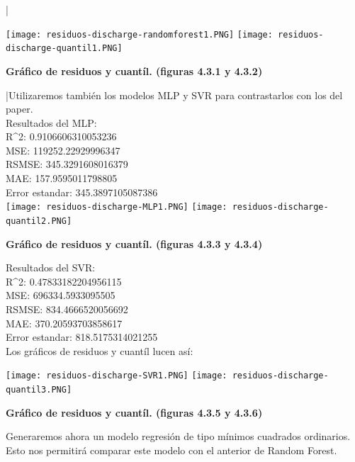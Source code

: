|\documentclass{article}
\begin{document}
        \texttt{[image: residuos-discharge-randomforest1.PNG]}
        \texttt{[image: residuos-discharge-quantil1.PNG]} \\
                \begin{center}
            \textbf{Gráfico de residuos y cuantíl. (figuras 4.3.1 y 4.3.2)}
        \end{center}



    |Utilizaremos también los modelos MLP y SVR para contrastarlos con los del paper.\\
Resultados del MLP:\\
    {R^2}:  0.9106606310053236\\
    MSE:  119252.22929996347\\
    RSMSE:  345.3291608016379\\
    MAE:  157.9595011798805\\
    Error estandar:  345.3897105087386\\
                                                         



        \texttt{[image: residuos-discharge-MLP1.PNG]} 
        \texttt{[image: residuos-discharge-quantil2.PNG]} \\
        \begin{center}
            \textbf{Gráfico de residuos y cuantíl. (figuras 4.3.3 y 4.3.4)}
        \end{center}


    Resultados del SVR:\\
    {R^2}:  0.47833182204956115\\
    MSE:  696334.5933095505\\
    RSMSE:  834.4666520056692\\
    MAE:  370.20593703858617\\
    Error estandar:  818.5175314021255\\

    Los gráficos de residuos y cuantíl lucen así: 

        \texttt{[image: residuos-discharge-SVR1.PNG]} 
        \texttt{[image: residuos-discharge-quantil3.PNG]} \\
        \begin{center}
            \textbf{Gráfico de residuos y cuantíl. (figuras 4.3.5 y 4.3.6)}
        \end{center}        


Generaremos ahora un modelo regresión de tipo mínimos cuadrados ordinarios. Esto nos permitirá comparar este modelo con el anterior de Random Forest.\\
\end{document}
